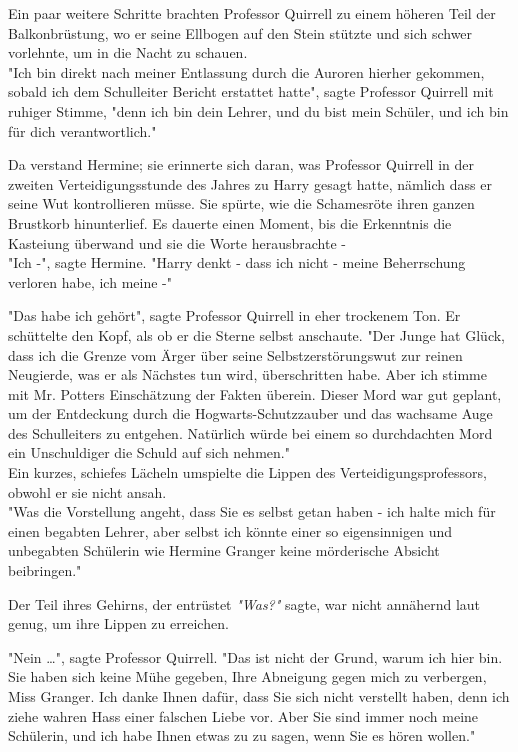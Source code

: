 {Ein paar weitere Schritte brachten Professor Quirrell zu einem höheren Teil der Balkonbrüstung, wo er seine Ellbogen auf den Stein stützte und sich schwer vorlehnte, um in die Nacht zu schauen.\\ "Ich bin direkt nach meiner Entlassung durch die Auroren hierher gekommen, sobald ich dem Schulleiter Bericht erstattet hatte", sagte Professor Quirrell mit ruhiger Stimme, "denn ich bin dein Lehrer, und du bist mein Schüler, und ich bin für dich verantwortlich."

Da verstand Hermine; sie erinnerte sich daran, was Professor Quirrell in der zweiten Verteidigungsstunde des Jahres zu Harry gesagt hatte, nämlich dass er seine Wut kontrollieren müsse. Sie spürte, wie die Schamesröte ihren ganzen Brustkorb hinunterlief. Es dauerte einen Moment, bis die Erkenntnis die Kasteiung überwand und sie die Worte herausbrachte -\\ "Ich -", sagte Hermine. "Harry denkt - dass ich nicht - meine Beherrschung verloren habe, ich meine -"

"Das habe ich gehört", sagte Professor Quirrell in eher trockenem Ton. Er schüttelte den Kopf, als ob er die Sterne selbst anschaute. "Der Junge hat Glück, dass ich die Grenze vom Ärger über seine Selbstzerstörungswut zur reinen Neugierde, was er als Nächstes tun wird, überschritten habe. Aber ich stimme mit Mr. Potters Einschätzung der Fakten überein. Dieser Mord war gut geplant, um der Entdeckung durch die Hogwarts-Schutzzauber und das wachsame Auge des Schulleiters zu entgehen. Natürlich würde bei einem so durchdachten Mord ein Unschuldiger die Schuld auf sich nehmen."\\ Ein kurzes, schiefes Lächeln umspielte die Lippen des Verteidigungsprofessors, obwohl er sie nicht ansah.\\ "Was die Vorstellung angeht, dass Sie es selbst getan haben - ich halte mich für einen begabten Lehrer, aber selbst ich könnte einer so eigensinnigen und unbegabten Schülerin wie Hermine Granger keine mörderische Absicht beibringen."

Der Teil ihres Gehirns, der entrüstet \emph{"Was?"} sagte, war nicht annähernd laut genug, um ihre Lippen zu erreichen.

"Nein …", sagte Professor Quirrell. "Das ist nicht der Grund, warum ich hier bin. Sie haben sich keine Mühe gegeben, Ihre Abneigung gegen mich zu verbergen, Miss Granger. Ich danke Ihnen dafür, dass Sie sich nicht verstellt haben, denn ich ziehe wahren Hass einer falschen Liebe vor. Aber Sie sind immer noch meine Schülerin, und ich habe Ihnen etwas zu zu sagen, wenn Sie es hören wollen."

}
